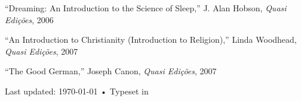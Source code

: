 \documentclass[11pt, a4paper]{article}
\newcommand{\years}[1]{\marginnote{\scriptsize #1}}
\begin{document}
\noindent\years{2006\emph{b}} ``Dreaming: An Introduction to the Science of
Sleep,'' J. Alan Hobson, \emph{Quasi Edições}, 2006


\noindent\years{2007\emph{a}} ``An Introduction to Christianity (Introduction to
Religion),'' Linda Woodhead, \emph{Quasi Edições}, 2007


\noindent\years{2007\emph{b}} ``The Good German,'' Joseph Canon, \emph{Quasi Edições}, 2007











\vfill{}

\begin{center}
  {\scriptsize  Last updated: \today\- •\- Typeset in \href{http://nitens.org/taraborelli/cvtex}{
      \XeTeX }}\\
\end{center}
\end{document}
